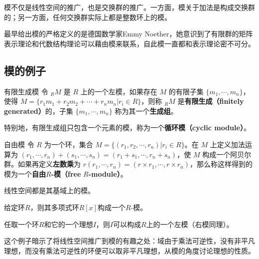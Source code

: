 模不仅是线性空间的推广，也是交换群的推广。一方面，模关于加法是构成交换群的；另一方面，任何交换群实际上都是整数环上的模。


最早给出模的严格定义的是德国数学家Emmy Noether，她意识到了有限群的矩阵表示理论和代数结构理论可以藉由模来联系，自此模一直都和表示理论密不可分。


\subsection{模的例子}


\begin{definition}{有限生成模}
令 $_RM$ 是 $R$ 上的一个左模，如果存在 $M$ 的有限子集 $\{m_1, \cdots, m_n\}$，使得 $M=\{r_1m_1+r_2m_2+\cdots+r_nm_n|r_i\in R\}$，则称 $_RM$ 是\textbf{有限生成（finitely generated）}的，子集 $\{m_1, \cdots, m_n\}$ 称为其一个\textbf{生成组}。

特别地，有限生成组只包含一个元素的模，称为一个\textbf{循环模（cyclic module）}。
\end{definition}


\begin{definition}{自由模}
令 $R$ 为一个环，集合 $M=\{(r_1, r_2, \cdots, r_n)|r_i\in R\}$。在 $M$ 上定义加法运算为 $(r_1, \cdots, r_n)+(s_1, \cdots, s_n)=(r_1+s_1, \cdots, r_n+s_n)$，使 $M$ 构成一个阿贝尔群。如果再定义\textbf{左数乘}为 $r(r_1, \cdots, r_n)=(r\times r_1, \cdots, r\times r_n)$，那么称这样得到的模为一个\textbf{自由}$R$\textbf{-模（free} $R$\textbf{-module）}。
\end{definition}







\begin{example}{}
线性空间都是其基域上的模。
\end{example}

\begin{example}{}
给定环$R$，则其多项式环$R[x]$构成一个$R$-模。
\end{example}



\begin{example}{}

任取一个环$R$和它的一个理想$I$，则$I$可以构成$R$上的一个左模（右模同理）。

这个例子暗示了将线性空间推广到模的有趣之处：域由于乘法可逆性，没有非平凡理想，而没有乘法可逆性的环便可以取非平凡理想，从模的角度讨论理想的性质。

\end{example}


